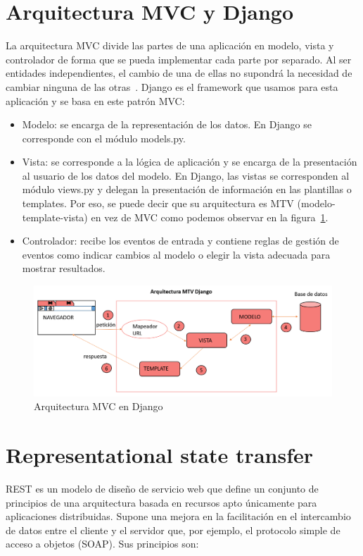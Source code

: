 \documentclass[a4paper, 12pt]{book}
\begin{document}
\section{Arquitectura MVC y Django}
La arquitectura MVC divide las partes de una aplicación en modelo, vista y controlador de forma que se pueda implementar cada parte por separado. Al ser entidades independientes, el cambio de una de ellas no supondrá la necesidad de cambiar ninguna de las otras~\cite{gonzalez2012patron}. Django es el framework que usamos para esta aplicación y se basa en este patrón MVC:

\begin{itemize}
    \item Modelo: se encarga de la representación de los datos. En Django se corresponde con el módulo models.py.
    \item Vista: se corresponde a la lógica de aplicación y se encarga de la presentación al usuario de los datos del modelo. En Django, las vistas se corresponden al módulo views.py y delegan la presentación de información en las plantillas o templates. Por eso, se puede decir que su arquitectura es MTV (modelo-template-vista) en vez de MVC como podemos observar en la figura~\ref{figura:MVC}.
    \item Controlador: recibe los eventos de entrada y contiene reglas de gestión de eventos como indicar cambios al modelo o elegir la vista adecuada para mostrar resultados. 
\end{itemize}

\begin{figure}[h]
        \centering
        \includegraphics[scale=0.5]{img/django_request.png}
        \caption{Arquitectura MVC en Django}
        \label{figura:MVC}
\end{figure}
\section{Representational state transfer}
REST es un modelo de diseño de servicio web que define un conjunto de principios de una arquitectura basada en recursos apto únicamente para aplicaciones distribuidas. Supone una mejora en la facilitación en el intercambio  de  datos  entre  el  cliente  y  el  servidor  que, por ejemplo, el protocolo simple de acceso a objetos (SOAP).  Sus principios son:
\end{document}
